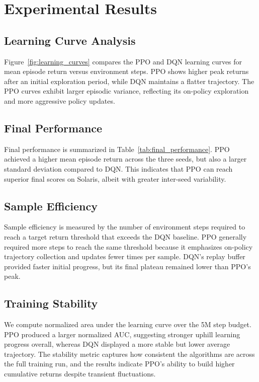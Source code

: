 \documentclass[conference]{IEEEtran}
\begin{document}
\section{Experimental Results}
\subsection{Learning Curve Analysis}
Figure~\ref{fig:learning_curves} compares the PPO and DQN learning curves for mean episode return versus environment steps. PPO shows higher peak returns after an initial exploration period, while DQN maintains a flatter trajectory. The PPO curves exhibit larger episodic variance, reflecting its on-policy exploration and more aggressive policy updates.

\subsection{Final Performance}
Final performance is summarized in Table~\ref{tab:final_performance}. PPO achieved a higher mean episode return across the three seeds, but also a larger standard deviation compared to DQN. This indicates that PPO can reach superior final scores on Solaris, albeit with greater inter-seed variability.

\subsection{Sample Efficiency}
Sample efficiency is measured by the number of environment steps required to reach a target return threshold that exceeds the DQN baseline. PPO generally required more steps to reach the same threshold because it emphasizes on-policy trajectory collection and updates fewer times per sample. DQN's replay buffer provided faster initial progress, but its final plateau remained lower than PPO's peak.

\subsection{Training Stability}
We compute normalized area under the learning curve over the 5M step budget. PPO produced a larger normalized AUC, suggesting stronger uphill learning progress overall, whereas DQN displayed a more stable but lower average trajectory. The stability metric captures how consistent the algorithms are across the full training run, and the results indicate PPO's ability to build higher cumulative returns despite transient fluctuations.
\end{document}
